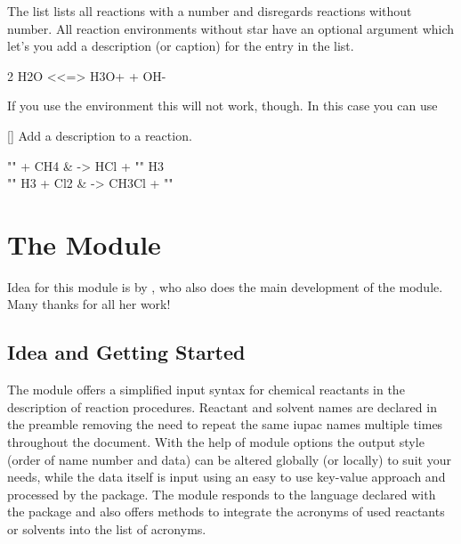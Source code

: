 \documentclass{chemmacros-manual}
\begin{document}
The list lists all reactions with a number and disregards reactions without
number.  All reaction environments without star have an optional argument
which let's you add a description (or caption) for the entry in the list.
\begin{example}
  \begin{reaction}[Autoprotolyse]
    2 H2O <<=> H3O+ + OH-
  \end{reaction}
\end{example}

If you use the  environment this will not work, though.  In
this case you can use
\begin{commands}
  []
    Add a description to a reaction.
\end{commands}

\begin{example}
  \begin{reactions}
    "" + CH4  &
      -> HCl + "" H3  \\
    "" H3 + Cl2 &
      -> CH3Cl + "" 
  \end{reactions}
\end{example}

\section{The  Module}\label{sec:reactants-module}
Idea for this module is by \leandriis, who also does the
main development of the module.  Many thanks for all her work!

\subsection{Idea and Getting Started}
The  module offers a simplified input syntax for chemical
reactants in the description of reaction procedures. Reactant and solvent
names are declared in the preamble removing the need to repeat the same
\ac{iupac} names multiple times throughout the document. With the help of
module options the output style (order of name number and data) can be altered
globally (or locally) to suit your needs, while the data itself is input using
an easy to use key-value approach and processed by the 
package. The  module responds to the language declared with
the  package and also offers methods to integrate the acronyms of
used reactants or solvents into the list of acronyms.
\end{document}
